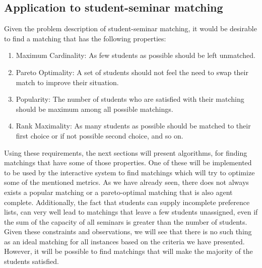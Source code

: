 \subsection{Application to student-seminar matching}
Given the problem description of student-seminar matching, it would be desirable to find a matching that has the following properties:
\begin{enumerate}
    \item Maximum Cardinality: As few students as possible should be left unmatched.
    \item Pareto Optimality: A set of students should not feel the need to swap their match to improve their situation.
    \item Popularity: The number of students who are satisfied with their matching should be maximum among all possible matchings.
    \item Rank Maximality: As many students as possible should be matched to their first choice or if not possible second choice, and so on.
\end{enumerate}
Using these requirements, the next sections will present algorithms, for finding matchings that have some of those properties. One of these will be implemented to be used by the interactive system to find matchings which will try to optimize some of the mentioned metrics. As we have already seen, there does not always exists a popular matching or a pareto-optimal matching that is also agent complete. Additionally, the fact that students can supply incomplete preference lists, can very well lead to matchings that leave a few students unassigned, even if the sum of the capacity of all seminars is greater than the number of students. Given these constraints and observations, we will see that there is no such thing as an ideal matching for all instances based on the criteria we have presented. However, it will be possible to find matchings that will make the majority of the students satisfied.